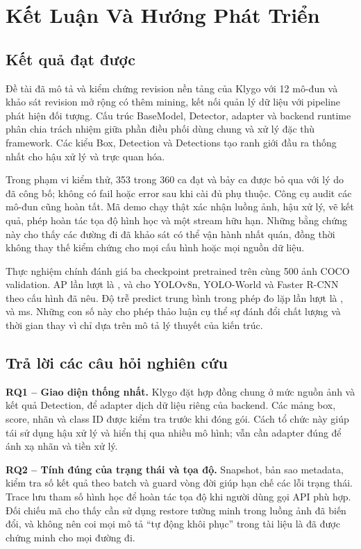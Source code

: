 \chapter{Kết Luận Và Hướng Phát Triển}
\label{chap:conclusion}
\section{Kết quả đạt được}
Đề tài đã mô tả và kiểm chứng revision nền tảng của Klygo với 12 mô-đun và khảo sát revision mở rộng có thêm mining, kết nối quản lý dữ liệu với pipeline phát hiện đối tượng. Cấu trúc BaseModel, Detector, adapter và backend runtime phân chia trách nhiệm giữa phần điều phối dùng chung và xử lý đặc thù framework. Các kiểu Box, Detection và Detections tạo ranh giới đầu ra thống nhất cho hậu xử lý và trực quan hóa.

Trong phạm vi kiểm thử, 353 trong 360 ca đạt và bảy ca được bỏ qua với lý do đã công bố; không có fail hoặc error sau khi cài đủ phụ thuộc. Công cụ audit các mô-đun cũng hoàn tất. Mã demo chạy thật xác nhận luồng ảnh, hậu xử lý, vẽ kết quả, phép hoàn tác tọa độ hình học và một stream hữu hạn. Những bằng chứng này cho thấy các đường đi đã khảo sát có thể vận hành nhất quán, đồng thời không thay thế kiểm chứng cho mọi cấu hình hoặc mọi nguồn dữ liệu.

Thực nghiệm chính đánh giá ba checkpoint pretrained trên cùng 500 ảnh COCO validation. AP lần lượt là \APYolo, \APWorld{} và \APFaster{} cho YOLOv8n, YOLO-World và Faster R-CNN theo cấu hình đã nêu. Độ trễ predict trung bình trong phép đo lặp lần lượt là \LatencyYolo, \LatencyWorld{} và \LatencyFaster{} ms. Những con số này cho phép thảo luận cụ thể sự đánh đổi chất lượng và thời gian thay vì chỉ dựa trên mô tả lý thuyết của kiến trúc.

\section{Trả lời các câu hỏi nghiên cứu}
\textbf{RQ1 -- Giao diện thống nhất.} Klygo đặt hợp đồng chung ở mức nguồn ảnh và kết quả Detection, để adapter dịch dữ liệu riêng của backend. Các mảng box, score, nhãn và class ID được kiểm tra trước khi đóng gói. Cách tổ chức này giúp tái sử dụng hậu xử lý và hiển thị qua nhiều mô hình; vẫn cần adapter đúng để ánh xạ nhãn và tiền xử lý.

\textbf{RQ2 -- Tính đúng của trạng thái và tọa độ.} Snapshot, bản sao metadata, kiểm tra số kết quả theo batch và guard vòng đời giúp hạn chế các lỗi trạng thái. Trace lưu tham số hình học để hoàn tác tọa độ khi người dùng gọi API phù hợp. Đối chiếu mã cho thấy cần sử dụng restore tường minh trong luồng ảnh đã biến đổi, và không nên coi mọi mô tả ``tự động khôi phục'' trong tài liệu là đã được chứng minh cho mọi đường đi.

